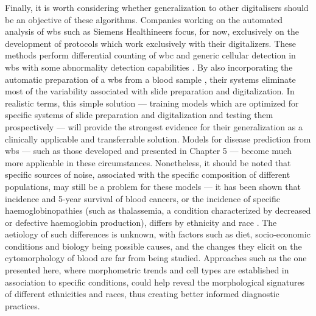 Finally, it is worth considering whether generalization to other digitalisers should be an objective of these algorithms. Companies working on the automated analysis of \ac{wbs} such as Siemens Healthineers focus, for now, exclusively on the development of protocols which work exclusively with their digitalizers. These methods perform differential counting of \ac{wbc} and generic cellular detection in \ac{wbs} with some abnormality detection capabilities \cite{cellavision,advia-120}. By also incorporating the automatic preparation of a \ac{wbs} from a blood sample \cite{advia-120}, their systems eliminate most of the variability associated with slide preparation and digitalization. In realistic terms, this simple solution --- training models which are optimized for specific systems of slide preparation and digitalization and testing them prospectively --- will provide the strongest evidence for their generalization as a clinically applicable and transferrable solution. Models for disease prediction from \ac{wbs} --- such as those developed and presented in Chapter 5 --- become much more applicable in these circumstances. Nonetheless, it should be noted that specific sources of noise, associated with the specific composition of different populations, may still be a problem for these models --- it has been shown that incidence and 5-year survival of blood cancers, or the incidence of specific haemoglobinopathies (such as thalassemia, a condition characterized by decreased or defective haemoglobin production), differs by ethnicity and race \cite{Kirtane2017-dh,Lorey1996-yc}. The aetiology of such differences is unknown, with factors such as diet, socio-economic conditions and biology being possible causes, and the changes they elicit on the cytomorphology of blood are far from being studied. Approaches such as the one presented here, where morphometric trends and cell types are established in association to specific conditions, could help reveal the morphological signatures of different ethnicities and races, thus creating better informed diagnostic practices.